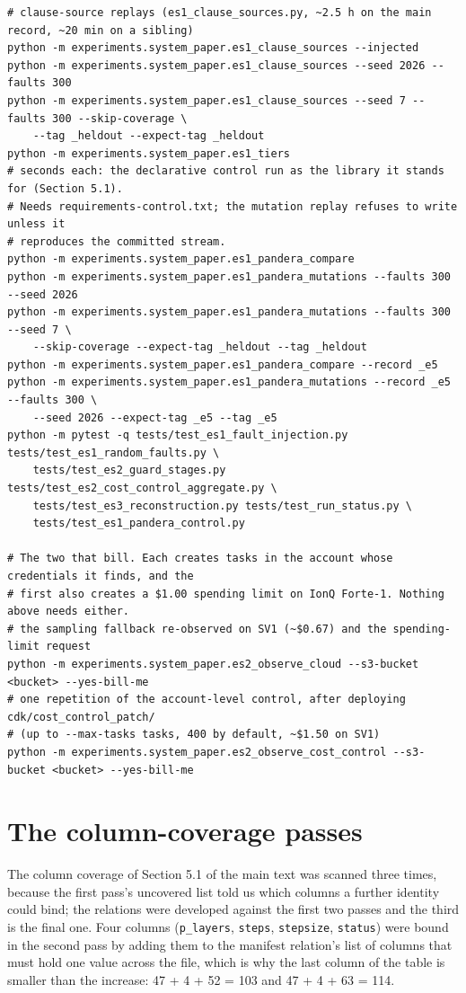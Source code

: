 \documentclass[acmsmall,screen,review]{acmart}
\begin{document}
\begin{small}
\begin{verbatim}
# clause-source replays (es1_clause_sources.py, ~2.5 h on the main record, ~20 min on a sibling)
python -m experiments.system_paper.es1_clause_sources --injected
python -m experiments.system_paper.es1_clause_sources --seed 2026 --faults 300
python -m experiments.system_paper.es1_clause_sources --seed 7 --faults 300 --skip-coverage \
    --tag _heldout --expect-tag _heldout
python -m experiments.system_paper.es1_tiers
# seconds each: the declarative control run as the library it stands for (Section 5.1).
# Needs requirements-control.txt; the mutation replay refuses to write unless it
# reproduces the committed stream.
python -m experiments.system_paper.es1_pandera_compare
python -m experiments.system_paper.es1_pandera_mutations --faults 300 --seed 2026
python -m experiments.system_paper.es1_pandera_mutations --faults 300 --seed 7 \
    --skip-coverage --expect-tag _heldout --tag _heldout
python -m experiments.system_paper.es1_pandera_compare --record _e5
python -m experiments.system_paper.es1_pandera_mutations --record _e5 --faults 300 \
    --seed 2026 --expect-tag _e5 --tag _e5
python -m pytest -q tests/test_es1_fault_injection.py tests/test_es1_random_faults.py \
    tests/test_es2_guard_stages.py tests/test_es2_cost_control_aggregate.py \
    tests/test_es3_reconstruction.py tests/test_run_status.py \
    tests/test_es1_pandera_control.py

# The two that bill. Each creates tasks in the account whose credentials it finds, and the
# first also creates a $1.00 spending limit on IonQ Forte-1. Nothing above needs either.
# the sampling fallback re-observed on SV1 (~$0.67) and the spending-limit request
python -m experiments.system_paper.es2_observe_cloud --s3-bucket <bucket> --yes-bill-me
# one repetition of the account-level control, after deploying cdk/cost_control_patch/
# (up to --max-tasks tasks, 400 by default, ~$1.50 on SV1)
python -m experiments.system_paper.es2_observe_cost_control --s3-bucket <bucket> --yes-bill-me
\end{verbatim}\end{small}

\section{The column-coverage passes}

The column coverage of Section 5.1 of the main text was scanned three times, because the first pass's uncovered list told us which columns a further identity could bind; the relations were developed against the first two passes and the third is the final one. Four columns (\texttt{p\_layers}, \texttt{steps}, \texttt{stepsize}, \texttt{status}) were bound in the second pass by adding them to the manifest relation's list of columns that must hold one value across the file, which is why the last column of the table is smaller than the increase: 47 + 4 + 52 = 103 and 47 + 4 + 63 = 114.
\end{document}
